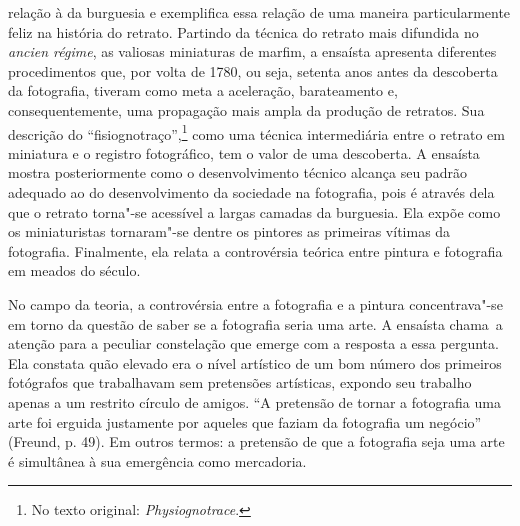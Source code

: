 relação à da burguesia e exemplifica essa relação de uma maneira
particularmente feliz na história do retrato. Partindo da técnica do
retrato mais difundida no \emph{ancien régime}, as valiosas miniaturas
de marfim, a ensaísta apresenta diferentes procedimentos que, por volta de
1780, ou seja, setenta anos antes da descoberta da fotografia, tiveram
como meta a aceleração, barateamento e, consequentemente, uma propagação
mais ampla da produção de retratos. Sua descrição do
``fisiognotraço'',\footnote{No texto original:
  \emph{Physiognotrace}. \versal{[N.~T.]}} como uma técnica intermediária
entre o retrato em
miniatura e o registro fotográfico, tem o valor de uma descoberta. A
ensaísta mostra posteriormente como o desenvolvimento técnico alcança seu
padrão adequado ao do desenvolvimento da sociedade na fotografia, pois é através dela que o retrato torna"-se
acessível a largas camadas da burguesia. Ela expõe como os miniaturistas
tornaram"-se dentre os pintores as primeiras vítimas da fotografia.
Finalmente, ela relata a controvérsia teórica entre pintura e
fotografia em meados do século.

No campo da teoria, a controvérsia entre a fotografia e a pintura
concentrava"-se em torno da questão de saber se a fotografia seria uma arte.
A ensaísta chama~a atenção para a peculiar constelação que emerge com a
resposta a essa pergunta. Ela constata quão elevado era o nível
artístico de um bom número dos primeiros fotógrafos que trabalhavam sem
pretensões artísticas, expondo seu trabalho apenas a um restrito
círculo de amigos. ``A pretensão de tornar a fotografia uma arte foi
erguida justamente por aqueles que faziam da fotografia um negócio''
(Freund, p. 49). Em outros termos: a pretensão de que a
fotografia seja uma arte é simultânea à sua emergência como mercadoria.

